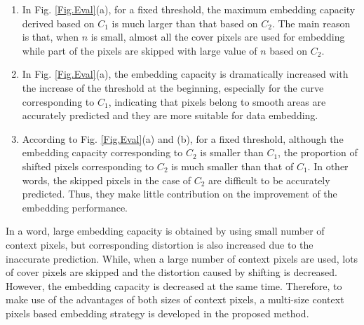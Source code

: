 \documentclass[review,3p,10pt,sort&compress]{elsarticle}
\begin{document}
\begin{enumerate}
  \item In Fig. \ref{Fig.Eval}(a), for a fixed threshold, the maximum embedding capacity derived based on $C_1$ is much larger than that based on $C_2$. The main reason is that, when $n$ is small, almost all the cover pixels are used for embedding while part of the pixels are skipped with large value of $n$ based on $C_2$.
  \item In Fig. \ref{Fig.Eval}(a), the embedding capacity is dramatically increased with the increase of the threshold at the beginning, especially for the curve corresponding to $C_1$, indicating that pixels belong to smooth areas are accurately predicted and they are more suitable for data embedding.
  \item According to Fig. \ref{Fig.Eval}(a) and (b), for a fixed threshold, although the embedding capacity corresponding to $C_2$ is smaller than $C_1$, the proportion of shifted pixels corresponding to $C_2$ is much smaller than that of $C_1$. In other words, the skipped pixels in the case of $C_2$ are difficult to be accurately predicted. Thus, they make little contribution on the improvement of the embedding performance.
\end{enumerate}
In a word, large embedding capacity is obtained by using small number of context pixels, but corresponding distortion is also increased due to the inaccurate prediction. While, when a large number of context pixels are used, lots of cover pixels are skipped and the distortion caused by shifting is decreased. However, the embedding capacity is decreased at the same time. Therefore, to make use of the advantages of both sizes of context pixels, a multi-size context pixels based embedding strategy is developed in the proposed method.

\end{document}
